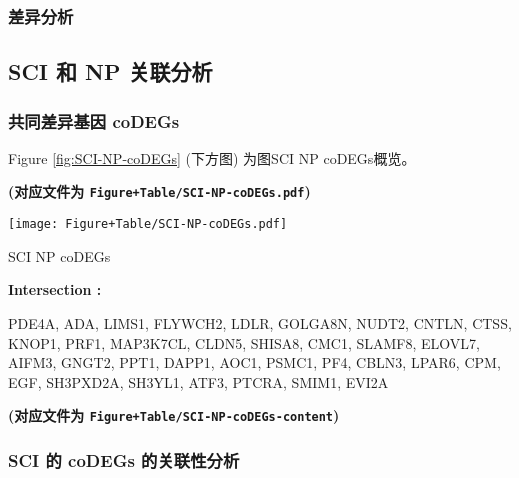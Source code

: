 \documentclass[
]{article}
\begin{document}
\hypertarget{ux5deeux5f02ux5206ux6790-1}{%
\subsubsection{差异分析}\label{ux5deeux5f02ux5206ux6790-1}}

\hypertarget{sci-ux548c-np-ux5173ux8054ux5206ux6790}{%
\subsection{SCI 和 NP 关联分析}\label{sci-ux548c-np-ux5173ux8054ux5206ux6790}}

\hypertarget{ux5171ux540cux5deeux5f02ux57faux56e0-codegs}{%
\subsubsection{共同差异基因 coDEGs}\label{ux5171ux540cux5deeux5f02ux57faux56e0-codegs}}

Figure \ref{fig:SCI-NP-coDEGs} (下方图) 为图SCI NP coDEGs概览。

\textbf{(对应文件为 \texttt{Figure+Table/SCI-NP-coDEGs.pdf})}

\def\@captype{figure}
\begin{center}
\texttt{[image: Figure+Table/SCI-NP-coDEGs.pdf]}
\caption{SCI NP coDEGs}\label{fig:SCI-NP-coDEGs}
\end{center}
\begin{center}\begin{tcolorbox}[colback=gray!10, colframe=gray!50, width=0.9\linewidth, arc=1mm, boxrule=0.5pt]
\textbf{
Intersection
:}

\vspace{0.5em}

    PDE4A, ADA, LIMS1, FLYWCH2, LDLR, GOLGA8N, NUDT2,
CNTLN, CTSS, KNOP1, PRF1, MAP3K7CL, CLDN5, SHISA8, CMC1,
SLAMF8, ELOVL7, AIFM3, GNGT2, PPT1, DAPP1, AOC1, PSMC1,
PF4, CBLN3, LPAR6, CPM, EGF, SH3PXD2A, SH3YL1, ATF3, PTCRA,
SMIM1, EVI2A

\vspace{2em}
\end{tcolorbox}
\end{center}

\textbf{(对应文件为 \texttt{Figure+Table/SCI-NP-coDEGs-content})}

\hypertarget{sci-ux7684-codegs-ux7684ux5173ux8054ux6027ux5206ux6790}{%
\subsubsection{SCI 的 coDEGs 的关联性分析}\label{sci-ux7684-codegs-ux7684ux5173ux8054ux6027ux5206ux6790}}
\end{document}
